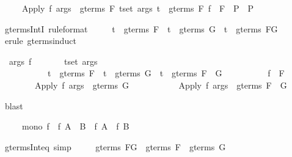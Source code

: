 \begin{isabellebody}
\begin{isamarkuptext}
\begin{isabelle}%
\ \ \ \ \ {\isasymlbrakk}Apply\ f\ args\ {\isasymin}\ gterms\ F{\isacharsemicolon}\ {\isasymlbrakk}{\isasymforall}t{\isasymin}set\ args{\isachardot}\ t\ {\isasymin}\ gterms\ F{\isacharsemicolon}\ f\ {\isasymin}\ F{\isasymrbrakk}\ {\isasymLongrightarrow}\ P{\isasymrbrakk}\ {\isasymLongrightarrow}\ P%
\end{isabelle}
%
\end{isamarkuptext}%
\ gterms{\isacharunderscore}IntI\ {\isacharbrackleft}rule{\isacharunderscore}format{\isacharbrackright}{\isacharcolon}\isanewline
\ \ \ \ \ {\isachardoublequote}t\ {\isasymin}\ gterms\ F\ {\isasymLongrightarrow}\ t\ {\isasymin}\ gterms\ G\ {\isasymlongrightarrow}\ t\ {\isasymin}\ gterms\ {\isacharparenleft}F{\isasyminter}G{\isacharparenright}{\isachardoublequote}\isanewline
{}\ {\isacharparenleft}erule\ gterms{\isachardot}induct{\isacharparenright}%
\begin{isamarkuptxt}%
\begin{isabelle}%
\ {}{\isachardot}\ {\isasymAnd}args\ f{\isachardot}\isanewline
\ \ \ \ \ \ \ {\isasymlbrakk}{\isasymforall}t{\isasymin}set\ args{\isachardot}\isanewline
\ \ \ \ \ \ \ \ \ \ \ t\ {\isasymin}\ gterms\ F\ {\isasymand}\ {\isacharparenleft}t\ {\isasymin}\ gterms\ G\ {\isasymlongrightarrow}\ t\ {\isasymin}\ gterms\ {\isacharparenleft}F\ {\isasyminter}\ G{\isacharparenright}{\isacharparenright}{\isacharsemicolon}\isanewline
\ \ \ \ \ \ \ \ \ \ f\ {\isasymin}\ F{\isasymrbrakk}\isanewline
\ \ \ \ \ \ \ {\isasymLongrightarrow}\ Apply\ f\ args\ {\isasymin}\ gterms\ G\ {\isasymlongrightarrow}\isanewline
\ \ \ \ \ \ \ \ \ \ Apply\ f\ args\ {\isasymin}\ gterms\ {\isacharparenleft}F\ {\isasyminter}\ G{\isacharparenright}%
\end{isabelle}%
\end{isamarkuptxt}%
\ blast\isanewline
{}%
\begin{isamarkuptext}%
\begin{isabelle}%
\ \ \ \ \ mono\ f\ {\isasymLongrightarrow}\ f\ {\isacharparenleft}A\ {\isasyminter}\ B{\isacharparenright}\ {\isasymsubseteq}\ f\ A\ {\isasyminter}\ f\ B%
\end{isabelle}
%
\end{isamarkuptext}%
\ gterms{\isacharunderscore}Int{\isacharunderscore}eq\ {\isacharbrackleft}simp{\isacharbrackright}{\isacharcolon}\isanewline
\ \ \ \ \ {\isachardoublequote}gterms\ {\isacharparenleft}F{\isasyminter}G{\isacharparenright}\ {\isacharequal}\ gterms\ F\ {\isasyminter}\ gterms\ G{\isachardoublequote}\isanewline

\end{isabellebody}
